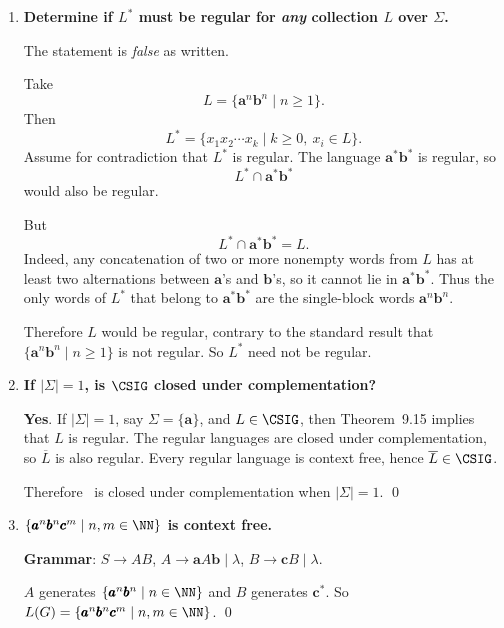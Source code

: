 \begin{enumerate}[{9.}1. ]
\begin{enumerate}
\item By the same observation, the grammars that do satisfy this restriction are
precisely the right-linear grammars.  Hence they generate exactly the regular
languages. \qed
\end{enumerate}

\item \textbf{Determine if $L^*$ must be regular for \emph{any}
collection $L$ over $\Sigma$.}

The statement is \emph{false} as written.

Take
\[
L=\{\pmb{a}^n\pmb{b}^n\mid n\geq 1\}.
\]
Then
\[
L^*=\{x_1x_2\cdots x_k\mid k\geq 0,\ x_i\in L\}.
\]
Assume for contradiction that $L^*$ is regular.  The language
$\pmb{a}^*\pmb{b}^*$ is regular, so
\[
L^*\cap \pmb{a}^*\pmb{b}^*
\]
would also be regular.

But
\[
L^*\cap \pmb{a}^*\pmb{b}^*=L.
\]
Indeed, any concatenation of two or more nonempty words from $L$ has at least
two alternations between $\pmb{a}$'s and $\pmb{b}$'s, so it cannot lie in
$\pmb{a}^*\pmb{b}^*$.  Thus the only words of $L^*$ that belong to
$\pmb{a}^*\pmb{b}^*$ are the single-block words $\pmb{a}^n\pmb{b}^n$.

Therefore $L$ would be regular, contrary to the standard result that
$\{\pmb{a}^n\pmb{b}^n\mid n\geq 1\}$ is not regular.  So $L^*$ need not be
regular.

\item \textbf{If $|\Sigma|=1$, is $\CSIG$ closed under complementation?}

\textbf{Yes}.  If $|\Sigma|=1$, say $\Sigma=\{\pmb{a}\}$, and
$L\in\CSIG$, then Theorem~9.15 implies that $L$ is regular.  The regular
languages are closed under complementation, so $\overline{L}$ is also regular.
Every regular language is context free, hence $\overline{L}\in\CSIG$.

Therefore \CSIG\ is closed under complementation when $|\Sigma|=1$. \qed

\item \textbf{$\{\pmb{a}^n\pmb{b}^n\pmb{c}^m \mid n,m \in \NN\}$ is context free.}

\textbf{Grammar}: $S \to AB$, $A \to \pmb{a}A\pmb{b} \mid \lambda$, $B \to \pmb{c}B \mid \lambda$.

$A$ generates $\{\pmb{a}^n\pmb{b}^n\mid n\in\NN\}$ and $B$ generates
$\pmb{c}^*$. So
$L(G) = \{\pmb{a}^n\pmb{b}^n\pmb{c}^m\mid n,m\in\NN\}$. \qed


\end{enumerate}
